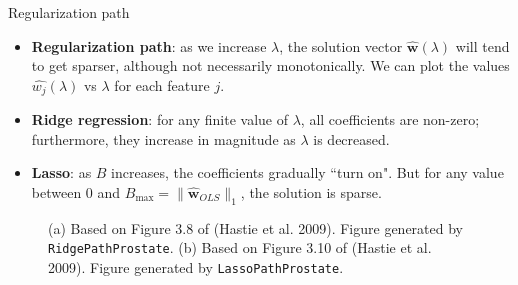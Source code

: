 \documentclass[10pt,mathserif]{beamer}
\begin{document}
\begin{frame}{Regularization path}
\begin{itemize}\itemsep=6pt
    \item \textbf{Regularization path}: as we increase $\lambda$, the solution vector $\hat{\bm{w}}(\lambda)$ will tend to get sparser, although not necessarily monotonically. We can plot the values $\hat{w_j}(\lambda)$ vs $\lambda$ for each feature $j$.
    \item \textbf{Ridge regression}: for any finite value of $\lambda$, all coefficients are non-zero; furthermore, they increase in magnitude as $\lambda$ is decreased.
    \item \textbf{Lasso}: as $B$ increases, the coefficients gradually ``turn on". But for any value between $0$ and $B_{\text{max}} = \|\hat{\bm{w}}_{OLS}\|_1$, the solution is sparse.
\end{itemize}    
    \begin{figure}
    \centering
    \caption{(a) Based on Figure 3.8 of (Hastie et al. 2009). Figure generated by \texttt{RidgePathProstate}. (b) Based on Figure 3.10 of (Hastie et al. 2009). Figure generated by \texttt{LassoPathProstate}.}
    \end{figure}    
\end{frame}
\end{document}

